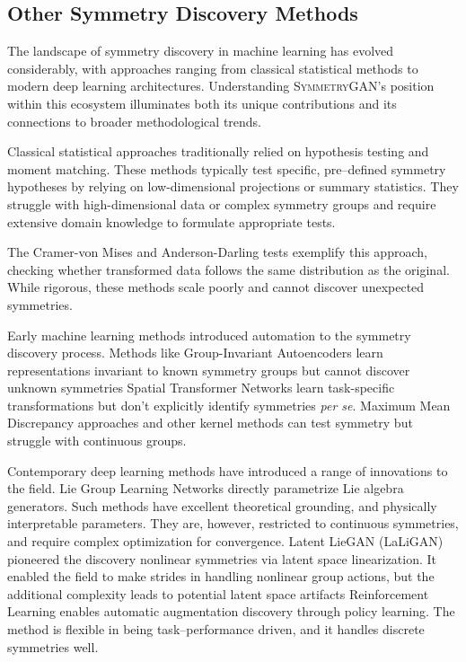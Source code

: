     \subsection{Other Symmetry Discovery Methods}
        The landscape of symmetry discovery in machine learning has evolved considerably, with approaches ranging from classical statistical methods to modern deep learning architectures.
        Understanding \textsc{SymmetryGAN}'s position within this ecosystem illuminates both its unique contributions and its connections to broader methodological trends.

        Classical statistical approaches traditionally relied on hypothesis testing and moment matching.
        These methods typically test specific, pre--defined symmetry hypotheses by relying on low-dimensional projections or summary statistics.
        They struggle with high-dimensional data or complex symmetry groups and require extensive domain knowledge to formulate appropriate tests.

        The Cramer-von Mises and Anderson-Darling tests exemplify this approach, checking whether transformed data follows the same distribution as the original.
        While rigorous, these methods scale poorly and cannot discover unexpected symmetries.

        Early machine learning methods introduced automation to the symmetry discovery process.
        Methods like Group-Invariant Autoencoders learn representations invariant to known symmetry groups but cannot discover unknown symmetries
        Spatial Transformer Networks learn task-specific transformations but don't explicitly identify symmetries \textit{per se}.
        Maximum Mean Discrepancy approaches and other kernel methods can test symmetry but struggle with continuous groups.

        Contemporary deep learning methods have introduced a range of innovations to the field.
        Lie Group Learning Networks directly parametrize Lie algebra generators.
        Such methods have excellent theoretical grounding, and physically interpretable parameters.
        They are, however, restricted to continuous symmetries, and require complex optimization for convergence.
        Latent LieGAN (LaLiGAN) pioneered the discovery nonlinear symmetries via latent space linearization.
        It enabled the field to make strides in handling nonlinear group actions, but the additional complexity leads to potential latent space artifacts
        Reinforcement Learning enables automatic augmentation discovery through policy learning.
        The method is flexible in being task--performance driven, and it handles discrete symmetries well.

